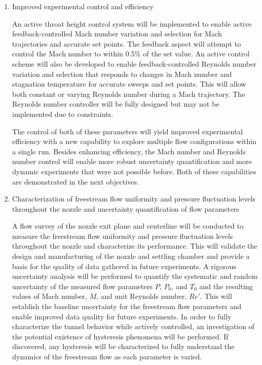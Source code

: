 \begin{enumerate}[listparindent=\parindent]
    \item Improved experimental control and efficiency
            
        An active throat height control system will be implemented to enable active feedback-controlled Mach number variation and selection for Mach trajectories and accurate set points. The feedback aspect will attempt to control the Mach number to within 0.5\% of the set value. An active control scheme will also be developed to enable feedback-controlled Reynolds number variation and selection that responds to changes in Mach number and stagnation temperature for accurate sweeps and set points. This will allow both constant or varying Reynolds number during a Mach trajectory. The Reynolds number controller will be fully designed but may not be implemented due to constraints.

        The control of both of these parameters will yield improved experimental efficiency with a new capability to explore multiple flow configurations within a single run. Besides enhancing efficiency, the Mach number and Reynolds number control will enable more robust uncertainty quantification and more dynamic experiments that were not possible before. Both of these capabilities are demonstrated in the next objectives.

    \item Characterization of freestream flow uniformity and pressure fluctuation levels throughout the nozzle and uncertainty quantification of flow parameters

        A flow survey of the nozzle exit plane and centerline will be conducted to measure the freestream flow uniformity and pressure fluctuation levels throughout the nozzle and characterize its performance. This will validate the design and manufacturing of the nozzle and settling chamber and provide a basis for the quality of data gathered in future experiments. A rigorous uncertainty analysis will be performed to quantify the systematic and random uncertainty of the measured flow parameters $P$, $P_0$, and $T_0$ and the resulting values of Mach number, $M$, and unit Reynolds number, $Re'$. This will establish the baseline uncertainty for the freestream flow parameters and enable improved data quality for future experiments. In order to fully characterize the tunnel behavior while actively controlled, an investigation of the potential existence of hysteresis phenomena will be performed. If discovered, any hysteresis will be characterized to fully understand the dynamics of the freestream flow as each parameter is varied.


\end{enumerate}
